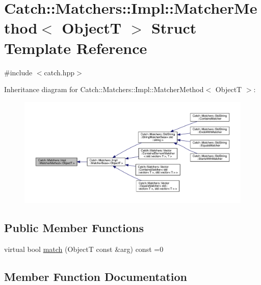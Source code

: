 \hypertarget{struct_catch_1_1_matchers_1_1_impl_1_1_matcher_method}{}\section{Catch\+:\+:Matchers\+:\+:Impl\+:\+:Matcher\+Method$<$ ObjectT $>$ Struct Template Reference}
\label{struct_catch_1_1_matchers_1_1_impl_1_1_matcher_method}


{\ttfamily \#include $<$catch.\+hpp$>$}



Inheritance diagram for Catch\+:\+:Matchers\+:\+:Impl\+:\+:Matcher\+Method$<$ ObjectT $>$\+:
\nopagebreak
\begin{figure}[H]
\begin{center}
\leavevmode
\includegraphics[width=350pt]{struct_catch_1_1_matchers_1_1_impl_1_1_matcher_method__inherit__graph}
\end{center}
\end{figure}
\subsection*{Public Member Functions}
\begin{DoxyCompactItemize}
\item 
virtual bool \hyperlink{struct_catch_1_1_matchers_1_1_impl_1_1_matcher_method_ae0920ff9e817acf08e1bb0cbcb044e30}{match} (ObjectT const \&arg) const =0
\end{DoxyCompactItemize}


\subsection{Member Function Documentation}
\mbox{\label{struct_catch_1_1_matchers_1_1_impl_1_1_matcher_method_ae0920ff9e817acf08e1bb0cbcb044e30}} 
